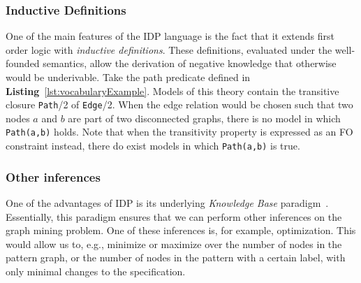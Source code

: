 

\subsubsection{Inductive Definitions}
One of the main features of the IDP language is the fact that it extends first order logic with \emph{inductive definitions}. These definitions, evaluated under the well-founded semantics, allow the derivation of negative knowledge that otherwise would be underivable.
Take the path predicate defined in \textbf{Listing}~\ref{lst:vocabularyExample}.
Models of this theory contain the transitive closure \lstinline|Path|/2 of \lstinline|Edge|/2.
When the edge relation would be chosen such that two nodes $a$ and $b$ are part of two disconnected graphs, there is no model in which \lstinline|Path(a,b)| holds. Note that when the transitivity property is expressed as an FO constraint instead, there do exist models in which \lstinline|Path(a,b)| is true.


\subsubsection{Other inferences}
One of the advantages of IDP is its underlying \emph{Knowledge Base} paradigm~\citep{WarrenBook/DeCatBBD16}.
Essentially, this paradigm ensures that we can perform other inferences on the graph mining problem.
One of these inferences is, for example, optimization.
This would allow us to, e.g., minimize or maximize over the number of nodes in the pattern graph, or the number of nodes in the pattern with a certain label, with only minimal changes to the specification.

\reversemarginpar

